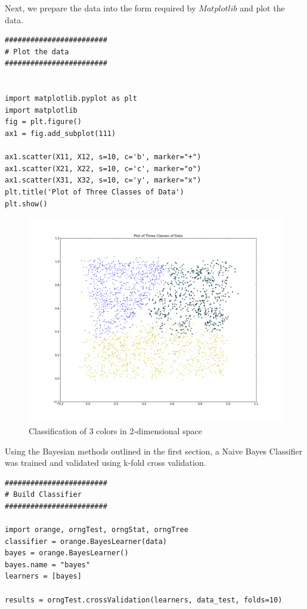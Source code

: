 \begin{flushleft}Next, we prepare the data into the form required by $Matplotlib$ and plot the data.
\end{flushleft}

\begin{lstlisting}[caption={Prepare the Data for Plotting; Plot the Data},label=2nd,firstnumber=87]
########################
# Plot the data
########################


import matplotlib.pyplot as plt
import matplotlib
fig = plt.figure()
ax1 = fig.add_subplot(111)

ax1.scatter(X11, X12, s=10, c='b', marker="+")
ax1.scatter(X21, X22, s=10, c='c', marker="o")
ax1.scatter(X31, X32, s=10, c='y', marker="x")
plt.title('Plot of Three Classes of Data')
plt.show()

\end{lstlisting}

\begin{figure}[H]
    \centering
       \includegraphics[width=6.5 in]{3_groups.png}
    \caption{Classification of 3 colors in 2-dimensional space}
    \label{Example Data}
\end{figure}


\begin{flushleft}Using the Bayesian methods outlined in the first section, a Naive Bayes Classifier was trained and validated using k-fold cross validation.
\end{flushleft}

\begin{lstlisting}[caption={Construct the Classifier},label=2nd,firstnumber=103]
########################
# Build Classifier
########################

import orange, orngTest, orngStat, orngTree   
classifier = orange.BayesLearner(data)
bayes = orange.BayesLearner()
bayes.name = "bayes"
learners = [bayes]

results = orngTest.crossValidation(learners, data_test, folds=10)
\end{lstlisting}


